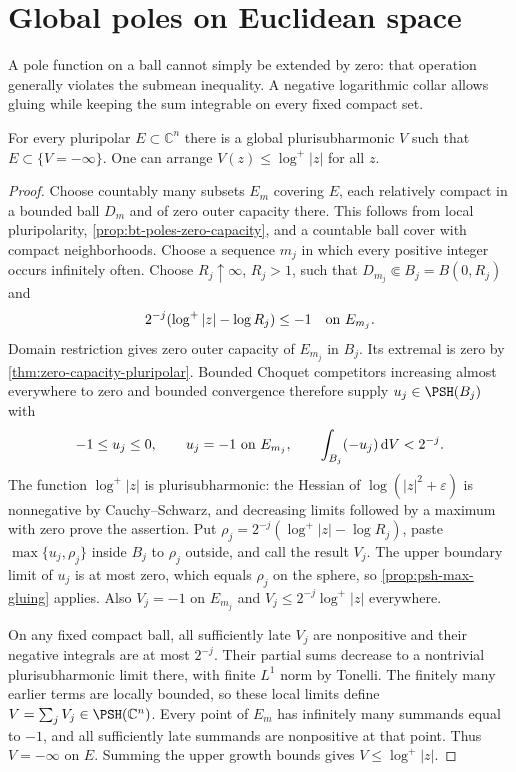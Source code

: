 \section{Global poles on Euclidean space}
\label{sec:josefson}

A pole function on a ball cannot simply be extended by zero: that operation generally violates the submean inequality. A negative logarithmic collar allows gluing while keeping the sum integrable on every fixed compact set.

\begin{theorem}[Josefson]\label{thm:josefson}
For every pluripolar $E\subset\mathbb C^n$ there is a global plurisubharmonic $V$ such that $E\subset\{V=-\infty\}$. One can arrange $V(z)\le\log^+|z|$ for all $z$.
\end{theorem}
\begin{proof}
Choose countably many subsets $E_m$ covering $E$, each relatively compact in a bounded ball $D_m$ and of zero outer capacity there. This follows from local pluripolarity, \cref{prop:bt-poles-zero-capacity}, and a countable ball cover with compact neighborhoods. Choose a sequence $m_j$ in which every positive integer occurs infinitely often. Choose $R_j\uparrow\infty$, $R_j>1$, such that $D_{m_j}\Subset B_j=B(0,R_j)$ and
\[
 2^{-j}(\log^+|z|-\log R_j)\le-1\quad\hbox{on }E_{m_j}.
\]
Domain restriction gives zero outer capacity of $E_{m_j}$ in $B_j$. Its extremal is zero by \cref{thm:zero-capacity-pluripolar}. Bounded Choquet competitors increasing almost everywhere to zero and bounded convergence therefore supply $u_j\in\PSH(B_j)$ with
\[
 -1\le u_j\le0,\qquad u_j=-1\ \hbox{on }E_{m_j},
 \qquad\int_{B_j}(-u_j)\,\mathrm dV<2^{-j}.
\]
The function $\log^+|z|$ is plurisubharmonic: the Hessian of $\log(|z|^2+\varepsilon)$ is nonnegative by Cauchy--Schwarz, and decreasing limits followed by a maximum with zero prove the assertion. Put $\rho_j=2^{-j}(\log^+|z|-\log R_j)$, paste $\max\{u_j,\rho_j\}$ inside $B_j$ to $\rho_j$ outside, and call the result $V_j$. The upper boundary limit of $u_j$ is at most zero, which equals $\rho_j$ on the sphere, so \cref{prop:psh-max-gluing} applies. Also $V_j=-1$ on $E_{m_j}$ and $V_j\le2^{-j}\log^+|z|$ everywhere.

On any fixed compact ball, all sufficiently late $V_j$ are nonpositive and their negative integrals are at most $2^{-j}$. Their partial sums decrease to a nontrivial plurisubharmonic limit there, with finite $L^1$ norm by Tonelli. The finitely many earlier terms are locally bounded, so these local limits define $V=\sum_jV_j\in\PSH(\mathbb C^n)$. Every point of $E_m$ has infinitely many summands equal to $-1$, and all sufficiently late summands are nonpositive at that point. Thus $V=-\infty$ on $E$. Summing the upper growth bounds gives $V\le\log^+|z|$.
\end{proof}

